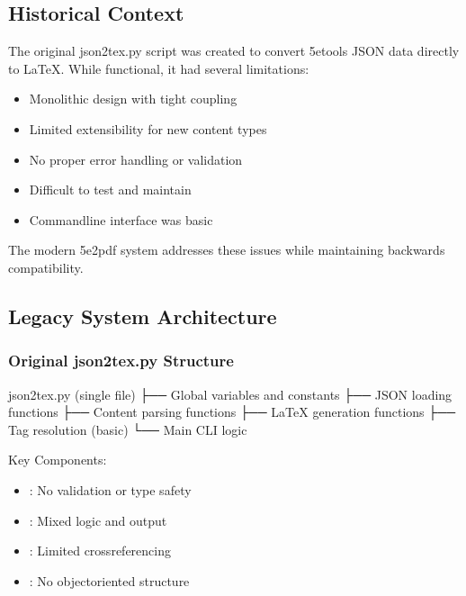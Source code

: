\documentclass[letterpaper,10pt,english]{sphinxmanual}
\begin{document}
\subsection{Historical Context}
\label{\detokenize{developer/legacy:historical-context}}
\sphinxAtStartPar
The original json2tex.py script was created to convert 5etools JSON data directly to LaTeX. While functional, it had several limitations:
\begin{itemize}
\item {} 
\sphinxAtStartPar
Monolithic design with tight coupling

\item {} 
\sphinxAtStartPar
Limited extensibility for new content types

\item {} 
\sphinxAtStartPar
No proper error handling or validation

\item {} 
\sphinxAtStartPar
Difficult to test and maintain

\item {} 
\sphinxAtStartPar
Command\sphinxhyphen{}line interface was basic

\end{itemize}

\sphinxAtStartPar
The modern 5e2pdf system addresses these issues while maintaining backwards compatibility.


\subsection{Legacy System Architecture}
\label{\detokenize{developer/legacy:legacy-system-architecture}}

\subsubsection{Original json2tex.py Structure}
\label{\detokenize{developer/legacy:original-json2tex-py-structure}}
\begin{sphinxVerbatim}[commandchars=\\\{\}]
json2tex.py (single file)
├── Global variables and constants
├── JSON loading functions
├── Content parsing functions
├── LaTeX generation functions
├── Tag resolution (basic)
└── Main CLI logic
\end{sphinxVerbatim}

\sphinxAtStartPar
Key Components:
\begin{itemize}
\item {} 
\sphinxAtStartPar
{}: No validation or type safety

\item {} 
\sphinxAtStartPar
{}: Mixed logic and output

\item {} 
\sphinxAtStartPar
{}: Limited cross\sphinxhyphen{}referencing

\item {} 
\sphinxAtStartPar
{}: No object\sphinxhyphen{}oriented structure

\end{itemize}
\end{document}
